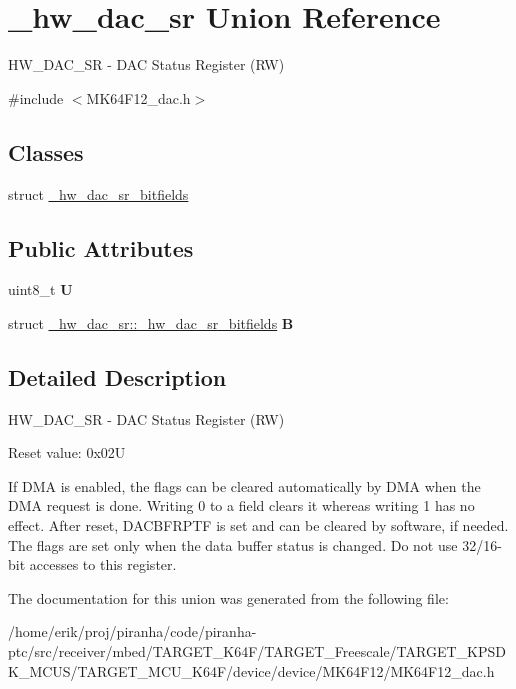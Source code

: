 \hypertarget{union__hw__dac__sr}{}\section{\+\_\+hw\+\_\+dac\+\_\+sr Union Reference}
\label{union__hw__dac__sr}


H\+W\+\_\+\+D\+A\+C\+\_\+\+SR -\/ D\+AC Status Register (RW)  




{\ttfamily \#include $<$M\+K64\+F12\+\_\+dac.\+h$>$}

\subsection*{Classes}
\begin{DoxyCompactItemize}
\item 
struct \hyperlink{struct__hw__dac__sr_1_1__hw__dac__sr__bitfields}{\+\_\+hw\+\_\+dac\+\_\+sr\+\_\+bitfields}
\end{DoxyCompactItemize}
\subsection*{Public Attributes}
\begin{DoxyCompactItemize}
\item 
uint8\+\_\+t {\bfseries U}\hypertarget{union__hw__dac__sr_ae2287ba3ade604c011286208dad94fca}{}\label{union__hw__dac__sr_ae2287ba3ade604c011286208dad94fca}

\item 
struct \hyperlink{struct__hw__dac__sr_1_1__hw__dac__sr__bitfields}{\+\_\+hw\+\_\+dac\+\_\+sr\+::\+\_\+hw\+\_\+dac\+\_\+sr\+\_\+bitfields} {\bfseries B}\hypertarget{union__hw__dac__sr_a1267778becd536f0b514b5d8102bcbce}{}\label{union__hw__dac__sr_a1267778becd536f0b514b5d8102bcbce}

\end{DoxyCompactItemize}


\subsection{Detailed Description}
H\+W\+\_\+\+D\+A\+C\+\_\+\+SR -\/ D\+AC Status Register (RW) 

Reset value\+: 0x02U

If D\+MA is enabled, the flags can be cleared automatically by D\+MA when the D\+MA request is done. Writing 0 to a field clears it whereas writing 1 has no effect. After reset, D\+A\+C\+B\+F\+R\+P\+TF is set and can be cleared by software, if needed. The flags are set only when the data buffer status is changed. Do not use 32/16-\/bit accesses to this register. 

The documentation for this union was generated from the following file\+:\begin{DoxyCompactItemize}
\item 
/home/erik/proj/piranha/code/piranha-\/ptc/src/receiver/mbed/\+T\+A\+R\+G\+E\+T\+\_\+\+K64\+F/\+T\+A\+R\+G\+E\+T\+\_\+\+Freescale/\+T\+A\+R\+G\+E\+T\+\_\+\+K\+P\+S\+D\+K\+\_\+\+M\+C\+U\+S/\+T\+A\+R\+G\+E\+T\+\_\+\+M\+C\+U\+\_\+\+K64\+F/device/device/\+M\+K64\+F12/M\+K64\+F12\+\_\+dac.\+h\end{DoxyCompactItemize}
